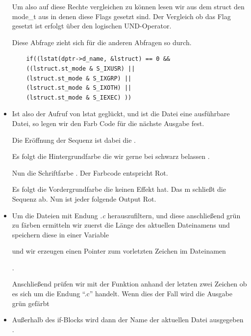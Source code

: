 \begin{itemize}
Um also auf diese Rechte vergleichen zu können lesen wir aus dem
struct den mode\_t aus in denen diese Flags gesetzt sind.
Der Vergleich ob das Flag gesetzt ist erfolgt über den logischen
UND-Operator.

Diese Abfrage zieht sich für die anderen Abfragen so durch.
\begin{lstlisting}
	if((lstat(dptr->d_name, &lstruct) == 0 &&
	((lstruct.st_mode & S_IXUSR) ||
	(lstruct.st_mode & S_IXGRP) ||
	(lstruct.st_mode & S_IXOTH) ||
	(lstruct.st_mode & S_IEXEC) ))
\end{lstlisting}

\item Ist also der Aufruf von lstat geglückt, und ist die Datei eine ausführbare
Datei, so legen wir den Farb Code für die nächste Ausgabe fest.

\command{printf("\\033[0;31;1m");}

Die Eröffnung der Sequenz ist dabei die \command{\\033[}.

Es folgt die Hintergrundfarbe die wir gerne bei schwarz belassen .

Nun die Schriftfarbe . Der Farbcode entspricht Rot.

Es folgt die Vordergrundfarbe  die keinen Effekt hat.
Das m schließt die Sequenz ab.
Nun ist jeder folgende Output Rot.

\item Um die Dateien mit Endung \textit{.c} herauszufiltern, und diese anschließend grün zu färben
ermitteln wir zuerst die Länge des aktuellen Dateinamens und speichern diese in einer Variable


und wir erzeugen einen Pointer zum vorletzten Zeichen im Dateinamen

.

Anschließend prüfen wir mit der Funktion 
anhand der letzten zwei Zeichen ob es sich um die Endung ``.c'' handelt.
Wenn dies der Fall wird die Ausgabe grün gefärbt \command{printf("\\033[0;32;1m");}

\item Außerhalb des if-Blocks wird dann der Name der aktuellen Datei
ausgegeben .


\end{itemize}
